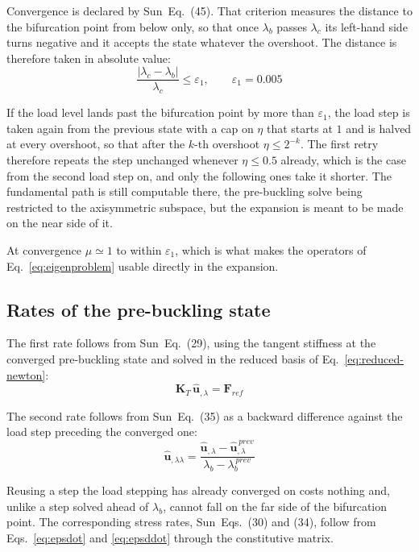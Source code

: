 \documentclass[11pt,a4paper]{article}
\begin{document}
Convergence is declared by Sun~Eq.~(45).  That criterion measures the distance
to the bifurcation point from below only, so that once $\lambda_b$ passes
$\lambda_c$ its left-hand side turns negative and it accepts the state
whatever the overshoot.  The distance is therefore taken in absolute value:
\begin{equation}\label{eq:convergence}
	\frac{\left| \lambda_c-\lambda_b \right|}{\lambda_c} \le \varepsilon_1,
	\qquad \varepsilon_1 = 0.005
\end{equation}

If the load level lands past the bifurcation point by more than
$\varepsilon_1$, the load step is taken again from the previous state with a
cap on $\eta$ that starts at $1$ and is halved at every overshoot, so that
after the $k$-th overshoot $\eta \le 2^{-k}$.  The first retry therefore
repeats the step unchanged whenever $\eta \le 0.5$ already, which is the case
from the second load step on, and only the following ones take it shorter.  The fundamental path is still computable there, the
pre-buckling solve being restricted to the axisymmetric subspace, but the
expansion is meant to be made on the near side of it.

At convergence $\mu \simeq 1$ to within $\varepsilon_1$, which is what makes
the operators of Eq.~\ref{eq:eigenproblem} usable directly in the expansion.

\subsection{Rates of the pre-buckling state}

The first rate follows from Sun~Eq.~(29), using the tangent stiffness at the
converged pre-buckling state and solved in the reduced basis of
Eq.~\ref{eq:reduced-newton}:
\begin{equation}\label{eq:udot}
	\boldsymbol{K}_T\,\boldsymbol{\hat{u}}_{,\lambda} = \boldsymbol{F}_{ref}
\end{equation}

The second rate follows from Sun~Eq.~(35) as a backward difference against the
load step preceding the converged one:
\begin{equation}\label{eq:uddot}
	\boldsymbol{\hat{u}}_{,\lambda\lambda}
	= \frac{\boldsymbol{\hat{u}}_{,\lambda} - \boldsymbol{\hat{u}}_{,\lambda}^{\,prev}}
	       {\lambda_b - \lambda_b^{\,prev}}
\end{equation}

Reusing a step the load stepping has already converged on costs nothing and,
unlike a step solved ahead of $\lambda_b$, cannot fall on the far side of the
bifurcation point.  The corresponding stress rates, Sun~Eqs.~(30) and (34),
follow from Eqs.~\ref{eq:epsdot} and \ref{eq:epsddot} through the constitutive
matrix.
\end{document}
